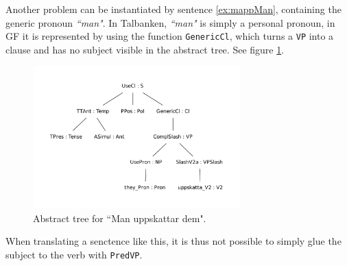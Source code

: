 \documentclass{report}
\begin{document}
Another problem can be instantiated by sentence \ref{ex:mappMan}, containing
the generic pronoun \emph{``man"}.
\label{ex:mappMan} %
In Talbanken, \emph{``man"} is simply a personal pronoun, 
in GF it is represented by using the function \verb|GenericCl|, which 
turns a \verb-VP- into a clause and has no
subject visible in the abstract tree. See figure \ref{fig:mappMan}.
\begin{figure}[h]
\centering
\includegraphics[width=80mm]{man.pdf}
\caption{Abstract tree for ``Man uppskattar dem".}
\label{fig:mappMan}
\end{figure}
When translating a senctence like this, it is thus not possible to simply glue the
subject to the verb with \verb|PredVP|.\\

%
\end{document}
